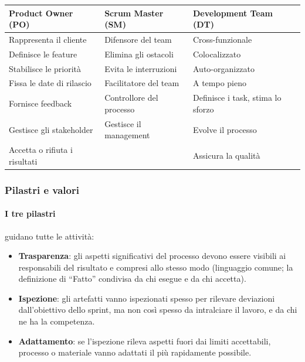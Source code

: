 \documentclass[a4paper,12pt]{article}
\begin{document}
\begin{center}
\begin{tabular}{|p{4.6cm}|p{4.6cm}|p{5.6cm}|}
\hline
\textbf{Product Owner (PO)} & \textbf{Scrum Master (SM)} & \textbf{Development Team (DT)}\\
\hline
Rappresenta il cliente & Difensore del team & Cross-funzionale\\
Definisce le feature & Elimina gli ostacoli & Colocalizzato\\
Stabilisce le priorità & Evita le interruzioni & Auto-organizzato\\
Fissa le date di rilascio & Facilitatore del team & A tempo pieno\\
Fornisce feedback & Controllore del processo & Definisce i task, stima lo sforzo\\
Gestisce gli stakeholder & Gestisce il management & Evolve il processo\\
Accetta o rifiuta i risultati & & Assicura la qualità\\
\hline
\end{tabular}
\end{center}

\subsubsection{Pilastri e valori}
\paragraph{I tre pilastri} guidano tutte le attività:
\begin{itemize}
  \item \textbf{Trasparenza}: gli aspetti significativi del processo devono essere
        visibili ai responsabili del risultato e compresi allo stesso modo (linguaggio
        comune; la definizione di ``Fatto'' condivisa da chi esegue e da chi accetta).
  \item \textbf{Ispezione}: gli artefatti vanno ispezionati spesso per rilevare
        deviazioni dall'obiettivo dello sprint, ma non così spesso da intralciare il
        lavoro, e da chi ne ha la competenza.
  \item \textbf{Adattamento}: se l'ispezione rileva aspetti fuori dai limiti accettabili,
        processo o materiale vanno adattati il più rapidamente possibile.
\end{itemize}
\end{document}
